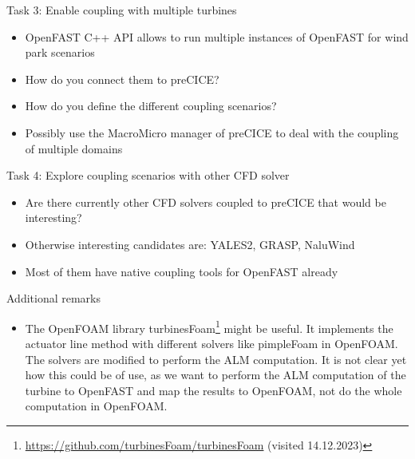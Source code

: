 Task 3: Enable coupling with multiple turbines
\begin{itemize}
	\item OpenFAST C++ API allows to run multiple instances of OpenFAST for wind park scenarios
	\item How do you connect them to preCICE? 
	\item How do you define the different coupling scenarios?
	\item Possibly use the MacroMicro manager of preCICE to deal with the coupling of multiple domains\\
\end{itemize}

Task 4: Explore coupling scenarios with other CFD solver
\begin{itemize}
	\item Are there currently other CFD solvers coupled to preCICE that would be interesting?
	\item Otherwise interesting candidates are: YALES2, GRASP, NaluWind
	\item Most of them have native coupling tools for OpenFAST already\\
\end{itemize}

Additional remarks
\begin{itemize}
	\item The OpenFOAM library turbinesFoam\footnote{\url{https://github.com/turbinesFoam/turbinesFoam} (visited 14.12.2023)} \cite{Bachant:2018} might be useful. It implements the actuator line method with different solvers like pimpleFoam in OpenFOAM. The solvers are modified to perform the ALM computation. It is not clear yet how this could be of use, as we want to perform the ALM computation of the turbine to OpenFAST and map the results to OpenFOAM, not do the whole computation in OpenFOAM.
\end{itemize}
